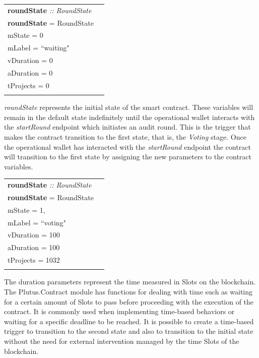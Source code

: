 \documentclass[12pt]{article}
\begin{document}
\begin{tabular}{lr}
\textbf{roundState} \emph{:: RoundState}\\
\textbf{roundState}  = RoundState  \textbraceleft{}
\\ \hspace{55mm}mState = 0
\\ \hspace{55mm}mLabel = ``waiting"
\\ \hspace{55mm}vDuration = 0
\\ \hspace{55mm}aDuration = 0
\\ \hspace{55mm}tProjects = 0
\\\hspace{49mm}\textbraceright{} 
\end{tabular}



 \emph{roundState} represents the initial state of the smart contract. These variables will remain in the default state indefinitely until the operational wallet interacts with the \emph{startRound} endpoint which initiates an audit round. This is the trigger that makes the contract transition to the first state, that is, the \emph{Voting} stage.
 Once the operational wallet has interacted with the \emph{startRound} endpoint the contract will transition to the first state by assigning the new parameters to the contract variables.
\\

\begin{tabular}{lr}
\textbf{roundState} \emph{:: RoundState}\\
\textbf{roundState}  = RoundState  \textbraceleft{}
\\ \hspace{55mm}mState = 1,
\\ \hspace{55mm}mLabel = ``voting"
\\ \hspace{55mm}vDuration = 100
\\ \hspace{55mm}aDuration = 100
\\ \hspace{55mm}tProjects = 1032
\\\hspace{50mm}\textbraceright{} 
\end{tabular}


 The duration parameters represent the time measured in Slots on the blockchain. The Plutus.Contract module has functions for dealing with time such as waiting for a certain amount of Slots to pass before proceeding with the execution of the contract. It is commonly used when implementing time-based behaviors or waiting for a specific deadline to be reached. It is possible to create a time-based trigger to transition to the second state and also to transition to the initial state without the need for external intervention managed by the time Slots of the blockchain.
\end{document}
